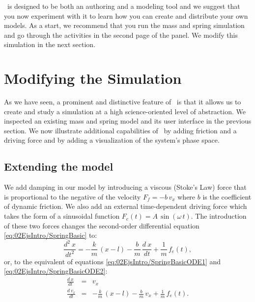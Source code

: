 \ejs\ is designed to be both an authoring and a modeling tool and we suggest that you now experiment with it to learn how you can create and distribute your own models. As a start, we recommend that you run the mass and spring simulation and go through the activities in the second page of the  panel.  We modify this simulation in the next section.
\section{Modifying the Simulation}\label{section:02Modifying}

As we have seen, a prominent and distinctive feature of \Ejs\ is that it allows us to create and study a simulation at a high science-oriented level of abstraction. We inspected an existing mass and spring model and its user interface in the previous section. We now illustrate additional capabilities of \Ejs\ by adding friction and a driving force and by adding a visualization of the system's phase space.

\subsection{Extending the model}\label{section:02ModifyingModel}

We add damping in our model by introducing a viscous (Stoke's Law) force that is proportional to the negative of the velocity $F_f = - b\,v_x$ where $b$ is the coefficient of dynamic friction. We also add an external time-dependent driving force which takes the form of a sinusoidal function $F_e(t)=A\,\sin(\omega\, t)$. The introduction of these two forces changes the second-order differential equation \eqref{eq:02EjsIntro/SpringBasic} to:
\begin{equation}
  \frac{d^2\ x}{dt^2} = -\frac{k}{m}\,(x-l) - \frac{b}{m}\,\frac{d\ x}{dt} + \frac{1}{m}\,f_e(t), \label{eq:02EjsIntro/SpringComplete}
\end{equation}
\noindent or, to the equivalent of equations \eqref{eq:02EjsIntro/SpringBasicODE1} and \eqref{eq:02EjsIntro/SpringBasicODE2}:
\begin{eqnarray}
  \frac{d\ x} {dt} &=& v_x                  \label{eq:02EjsIntro/SpringCompleteODE1} \\
  \frac{d\ v_x}{dt} &=& -\frac{k}{m}\,(x-l) - \frac{b}{m}\,v_x + \frac{1}{m}\,f_e(t). \label{eq:02EjsIntro/SpringCompleteODE2}
\end{eqnarray}

